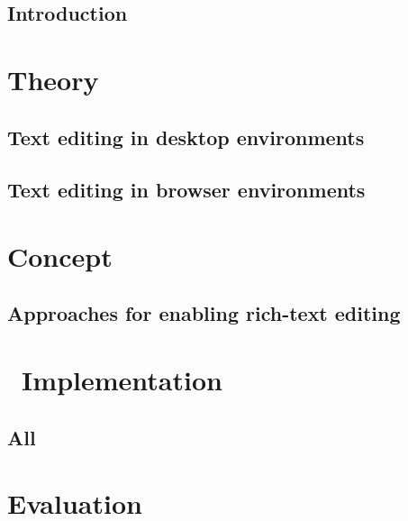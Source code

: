\chapter{Introduction}



\part{Theory}
\label{part:theory}

\chapter{Text editing in desktop environments}
\label{ch:desktop}



\chapter{Text editing in browser environments}
\label{ch:browser}



















\part{Concept}
\label{part-concept}

\chapter{Approaches for enabling rich-text editing}
\label{ch:approaches}



\part{\ Implementation}
\label{part:implementation}

\chapter{All}
\label{ch:impl_all}



\part{Evaluation}
\label{part:evaluation}

